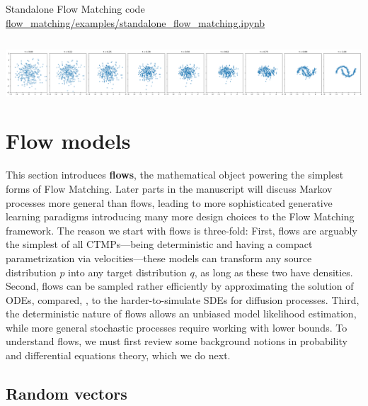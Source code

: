 \documentclass{fairmeta}
\newcommand{\highlight}[1]{{\color{metablue} \textbf{#1}}}
\numberwithin{equation}{section}
\begin{document}
\begin{pbox}[label={ex:fm_standalone}]{Standalone Flow Matching code \\ \url{flow_matching/examples/standalone_flow_matching.ipynb}}
\inputminted{python}{assets/demo.py}
\vspace{0.5cm}
\includegraphics[width=\textwidth]{assets/half_moons.png}
\end{pbox}

\section{Flow models}\label{s:flow_models}

This section introduces \highlight{flows}, the mathematical object powering the simplest forms of Flow Matching.
Later parts in the manuscript will discuss Markov processes more general than flows, leading to more sophisticated generative learning paradigms introducing many more design choices to the Flow Matching framework. 
The reason we start with flows is three-fold: First, flows are arguably the simplest of all CTMPs---being deterministic and having a compact parametrization via velocities---these models can transform any source distribution $p$ into any target distribution $q$, as long as these two have densities. Second, flows can be sampled rather efficiently by approximating the solution of ODEs, compared, \eg, to the harder-to-simulate SDEs for diffusion processes. Third, the deterministic nature of flows allows an  unbiased model likelihood estimation, while more general stochastic processes require working with lower bounds.
To understand flows, we must first review some background notions in probability and differential equations theory, which we do next. 

\subsection{Random vectors}
\end{document}
